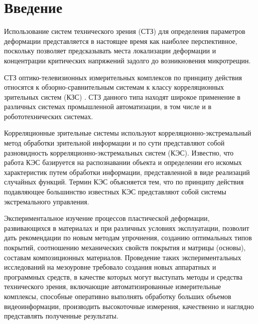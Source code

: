 \setcounter{figure}{0}
\newpage
\section*{Введение}



Использование систем технического зрения (СТЗ) для определения параметров деформации представляется в настоящее время как наиболее перспективное, поскольку позволяет предсказывать места локализации деформации и концентрации критических напряжений задолго до возникновения микротрещин.

СТЗ оптико-телевизионных измерительных комплексов по принципу действия относятся к обзорно-сравнительным системам к классу корреляционных зрительных систем (КЗС) \cite{korrel_robot}. СТЗ данного типа находят широкое применение в различных системах промышленной автоматизации, в том числе и в робототехнических системах.

Корреляционные зрительные системы используют корреляционно-экстремальный метод обработки зрительной информации и по сути представляют собой разновидность корреляционно-экстремальных систем (КЭС). Известно, что работа КЭС базируется на распознавании объекта и определении его искомых характеристик путем обработки информации, представленной в виде реализаций случайных функций. Термин КЭС объясняется тем, что по принципу действия подавляющее большинство известных КЭС представляют собой системы экстремального управления.

Экспериментальное изучение процессов пластической деформации, развивающихся в материалах и при различных условиях эксплуатации, позволит дать рекомендации по новым методам упрочнения, созданию оптимальных типов покрытий, соотношению механических свойств покрытия и матрицы (основы), составам композиционных материалов. Проведение таких экспериментальных исследований на мезоуровне требовало создания новых аппаратных и программных средств, в качестве которых могут выступать методы и средства технического зрения, включающие автоматизированные измерительные комплексы, способные оперативно выполнять обработку больших объемов видеоинформации, производить высокоточные измерения, качественно и наглядно представлять полученные результаты.

